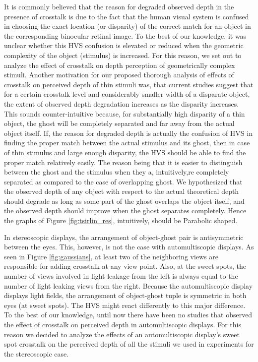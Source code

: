 It is commonly believed that the reason for degraded observed depth in the presence of crosstalk is due to the fact that the human visual system is confused in choosing the exact location (or disparity) of the correct match for an object in the corresponding binocular retinal image. To the best of our knowledge, it was unclear whether this HVS confusion is elevated or reduced when the geometric complexity of the object (stimulus) is increased. For this reason, we set out to analyze the effect of crosstalk on depth perception of geometrically complex stimuli. Another motivation for our proposed thorough analysis of effects of crosstalk on perceived depth of thin stimuli was, that current studies suggest that for a certain crosstalk level and considerably smaller width of a disparate object, the extent of observed depth degradation increases as the disparity increases. This sounds counter-intuitive because, for substantially high disparity of a thin object, the ghost will be completely separated and far away from the actual object itself. If, the reason for degraded depth is actually the confusion of HVS in finding the proper match between the actual stimulus and its ghost, then in case of thin stimulus and large enough disparity, the HVS should be able to find the proper match relatively easily. The reason being that it is easier to distinguish between the ghost and the stimulus when they a, intuitively,re completely separated as compared to the case of overlapping ghost. We hypothesized that the observed depth of any object with respect to the actual theoretical depth should degrade as long as some part of the ghost overlaps the object itself, and the observed depth should improve when the ghost separates completely. Hence the graphs of Figure \ref{fig:tsirlin_res}, intuitively, should be Parabolic shaped.

In stereoscopic displays, the arrangement of object-ghost pair is antisymmetric between the eyes. This, however, is not the case with automultiscopic displays. As seen in Figure \ref{fig:gaussians}, at least two of the neighboring views are responsible for adding crosstalk at any view point. Also, at the sweet spots, the number of views involved in light leakage from the left is always equal to the number of light leaking views from the right. Because the automultiscopic display displays light fields, the arrangement of object-ghost tuple is symmetric in both eyes (at sweet spots). The HVS might react differently to this major difference. To the best of our knowledge, until now there have been no studies that observed the effect of crosstalk on perceived depth in automultiscopic displays. For this reason we decided to analyze the effects of an automultiscopic display's sweet spot crosstalk on the perceived depth of all the stimuli we used in experiments for the stereoscopic case.

